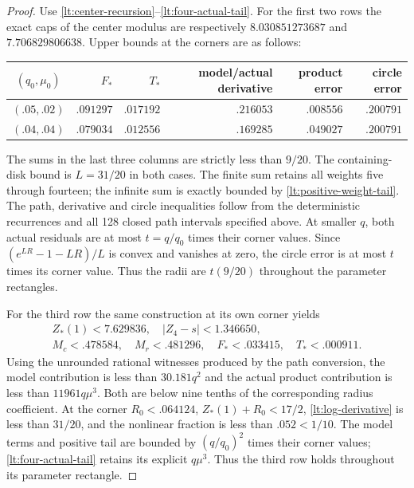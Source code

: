 \documentclass[11pt,reqno]{amsart}
\numberwithin{equation}{section}
\theoremstyle{definition}
\theoremstyle{remark}
\begin{document}
\begin{proof}
Use \eqref{lt:center-recursion}--\eqref{lt:four-actual-tail}. For the
first two rows the exact caps of the center modulus are respectively
$8.030851273687$ and $7.706829806638$. Upper bounds at
the corners are as follows:
\begin{center}\small
\begin{tabular}{c|rrrrr}
\toprule
$(q_0,\mu_0)$&$F_*$&$T_*$&model/actual derivative&product error&circle error\\\midrule
$(.05,.02)$&$.091297$&$.017192$&$.216053$&$.008556$&$.200791$\\
$(.04,.04)$&$.079034$&$.012556$&$.169285$&$.049027$&$.200791$\\\bottomrule
\end{tabular}
\end{center}
The sums in the last three columns are strictly less than $9/20$.
The containing-disk bound is $L=31/20$ in both cases.
The finite sum retains all weights five through fourteen; the
infinite sum is exactly bounded by \eqref{lt:positive-weight-tail}.
The path, derivative and circle inequalities follow from
the deterministic recurrences and all 128 closed path intervals
specified above. At smaller $q$, both actual residuals are at most
$t=q/q_0$ times their corner values. Since
$(e^{LR}-1-LR)/L$ is convex and vanishes at zero, the circle error
is at most $t$ times its corner value. Thus the radii are $t(9/20)$
throughout the parameter rectangles.

For the third row the same construction at its own corner yields
\begin{gather*}
 Z_*(1)<7.629836,\quad |Z_4-s|<1.346650,\\
 M_c<.478584,\quad M_r<.481296,\quad
 F_*<.033415,\quad T_*<.000911.
\end{gather*}
Using the unrounded rational witnesses produced by the path conversion,
the model contribution is less than $30.181q^2$ and the actual
product contribution is less than $11961q\mu^3$.
Both are below nine tenths of the corresponding radius coefficient.
At the corner $R_0<.064124$, $Z_*(1)+R_0<17/2$,
\eqref{lt:log-derivative} is less than $31/20$, and the nonlinear
fraction is less than $.052<1/10$. The model terms and positive tail
are bounded by $(q/q_0)^2$ times their corner values;
\eqref{lt:four-actual-tail} retains its explicit $q\mu^3$.
Thus the third row holds throughout its parameter rectangle.


\end{proof}
\end{document}
